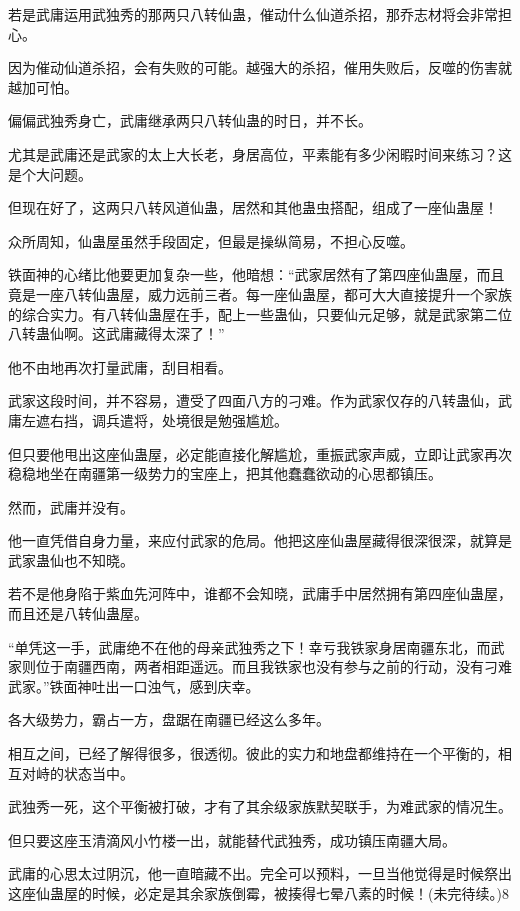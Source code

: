 \begin{this_body}
若是武庸运用武独秀的那两只八转仙蛊，催动什么仙道杀招，那乔志材将会非常担心。

因为催动仙道杀招，会有失败的可能。越强大的杀招，催用失败后，反噬的伤害就越加可怕。

偏偏武独秀身亡，武庸继承两只八转仙蛊的时日，并不长。

尤其是武庸还是武家的太上大长老，身居高位，平素能有多少闲暇时间来练习？这是个大问题。

但现在好了，这两只八转风道仙蛊，居然和其他蛊虫搭配，组成了一座仙蛊屋！

众所周知，仙蛊屋虽然手段固定，但最是操纵简易，不担心反噬。

铁面神的心绪比他要更加复杂一些，他暗想：“武家居然有了第四座仙蛊屋，而且竟是一座八转仙蛊屋，威力远前三者。每一座仙蛊屋，都可大大直接提升一个家族的综合实力。有八转仙蛊屋在手，配上一些蛊仙，只要仙元足够，就是武家第二位八转蛊仙啊。这武庸藏得太深了！”

他不由地再次打量武庸，刮目相看。

武家这段时间，并不容易，遭受了四面八方的刁难。作为武家仅存的八转蛊仙，武庸左遮右挡，调兵遣将，处境很是勉强尴尬。

但只要他甩出这座仙蛊屋，必定能直接化解尴尬，重振武家声威，立即让武家再次稳稳地坐在南疆第一级势力的宝座上，把其他蠢蠢欲动的心思都镇压。

然而，武庸并没有。

他一直凭借自身力量，来应付武家的危局。他把这座仙蛊屋藏得很深很深，就算是武家蛊仙也不知晓。

若不是他身陷于紫血先河阵中，谁都不会知晓，武庸手中居然拥有第四座仙蛊屋，而且还是八转仙蛊屋。

“单凭这一手，武庸绝不在他的母亲武独秀之下！幸亏我铁家身居南疆东北，而武家则位于南疆西南，两者相距遥远。而且我铁家也没有参与之前的行动，没有刁难武家。”铁面神吐出一口浊气，感到庆幸。

各大级势力，霸占一方，盘踞在南疆已经这么多年。

相互之间，已经了解得很多，很透彻。彼此的实力和地盘都维持在一个平衡的，相互对峙的状态当中。

武独秀一死，这个平衡被打破，才有了其余级家族默契联手，为难武家的情况生。

但只要这座玉清滴风小竹楼一出，就能替代武独秀，成功镇压南疆大局。

武庸的心思太过阴沉，他一直暗藏不出。完全可以预料，一旦当他觉得是时候祭出这座仙蛊屋的时候，必定是其余家族倒霉，被揍得七晕八素的时候！(未完待续。)8

\end{this_body}


